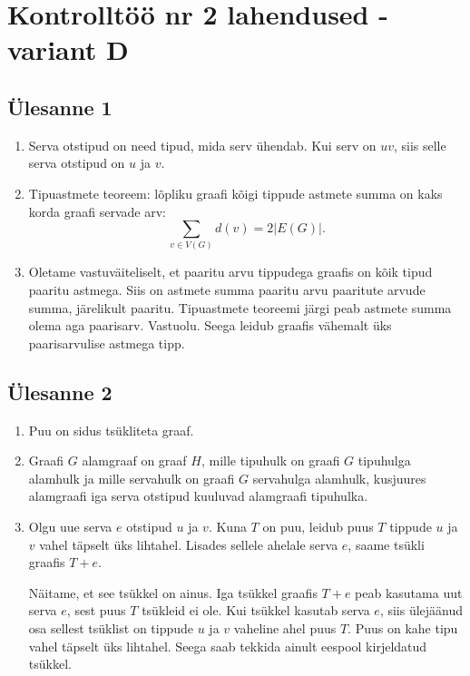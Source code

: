 \documentclass[11pt,a4paper]{article}
\newcommand{\yl}[1]{\subsection*{Ülesanne #1}}
\newcommand{\variant}[1]{\newpage\section*{Kontrolltöö nr 2 lahendused - variant #1}}
\begin{document}
\variant{D}

\yl{1}
\begin{enumerate}[label=\alph*.]
\item Serva otstipud on need tipud, mida serv ühendab. Kui serv on $uv$, siis selle serva otstipud on $u$ ja $v$.
\item Tipuastmete teoreem: lõpliku graafi kõigi tippude astmete summa on kaks korda graafi servade arv:
\[
\sum_{v\in V(G)}d(v)=2|E(G)|.
\]
\item Oletame vastuväiteliselt, et paaritu arvu tippudega graafis on kõik tipud paaritu astmega. Siis on astmete summa paaritu arvu paaritute arvude summa, järelikult paaritu. Tipuastmete teoreemi järgi peab astmete summa olema aga paarisarv. Vastuolu. Seega leidub graafis vähemalt üks paarisarvulise astmega tipp.
\end{enumerate}

\yl{2}
\begin{enumerate}[label=\alph*.]
\item Puu on sidus tsükliteta graaf.
\item Graafi $G$ alamgraaf on graaf $H$, mille tipuhulk on graafi $G$ tipuhulga alamhulk ja mille servahulk on graafi $G$ servahulga alamhulk, kusjuures alamgraafi iga serva otstipud kuuluvad alamgraafi tipuhulka.
\item Olgu uue serva $e$ otstipud $u$ ja $v$. Kuna $T$ on puu, leidub puus $T$ tippude $u$ ja $v$ vahel täpselt üks lihtahel. Lisades sellele ahelale serva $e$, saame tsükli graafis $T+e$.

Näitame, et see tsükkel on ainus. Iga tsükkel graafis $T+e$ peab kasutama uut serva $e$, sest puus $T$ tsükleid ei ole. Kui tsükkel kasutab serva $e$, siis ülejäänud osa sellest tsüklist on tippude $u$ ja $v$ vaheline ahel puus $T$. Puus on kahe tipu vahel täpselt üks lihtahel. Seega saab tekkida ainult eespool kirjeldatud tsükkel.
\end{enumerate}
\end{document}
